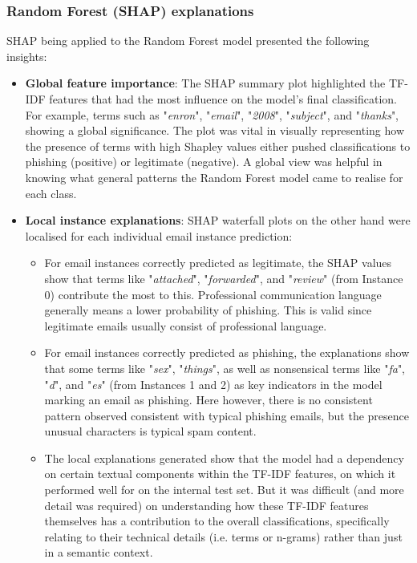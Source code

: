 
\subsubsection*{Random Forest (SHAP) explanations}
SHAP being applied to the Random Forest model presented the following insights:

\begin{itemize}
  \item \textbf{Global feature importance}: The SHAP summary plot highlighted the TF-IDF features that had the most influence on the model's final classification. For example, terms such as "\textit{enron}", "\textit{email}", "\textit{2008}", "\textit{subject}", and "\textit{thanks}", showing a global significance. The plot was vital in visually representing how the presence of terms with high Shapley values either pushed classifications to phishing (positive) or legitimate (negative). A global view was helpful in knowing what general patterns the Random Forest model came to realise for each class.
  \item \textbf{Local instance explanations}: SHAP waterfall plots on the other hand were localised for each individual email instance prediction:
  \begin{itemize}
    \item For email instances correctly predicted as legitimate, the SHAP values show that terms like "\textit{attached}", "\textit{forwarded}", and "\textit{review}" (from Instance 0) contribute the most to this. Professional communication language generally means a lower probability of phishing. This is valid since legitimate emails usually consist of professional language.
    \item For email instances correctly predicted as phishing, the explanations show that some terms like "\textit{sex}", "\textit{things}", as well as nonsensical terms like "\textit{fa}", "\textit{d}", and "\textit{es}" (from Instances 1 and 2) as key indicators in the model marking an email as phishing. Here however, there is no consistent pattern observed consistent with typical phishing emails, but the presence unusual characters is typical spam content.
    \item The local explanations generated show that the model had a dependency on certain textual components within the TF-IDF features, on which it performed well for on the internal test set. But it was difficult (and more detail was required) on understanding how these TF-IDF features themselves has a contribution to the overall classifications, specifically relating to their technical details (i.e. terms or n-grams) rather than just in a semantic context.
  \end{itemize}
\end{itemize}
